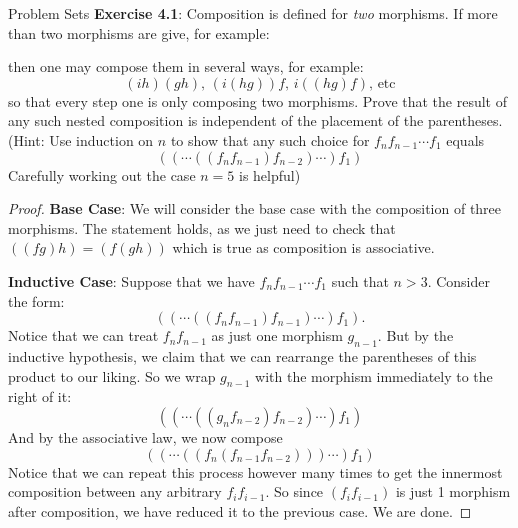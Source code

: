 \documentclass{report}
\begin{document}
\begin{exercises}{Problem Sets}
    \textbf{Exercise 4.1}: Composition is defined for \textit{two} morphisms. If more than two morphisms are give, for example:
        \begin{center}
        \end{center}
    then one may compose them in several ways, for example:
        \begin{equation*}
            (ih)(gh), \, (i(hg))f, \, i((hg)f), \, \text{etc}
        \end{equation*}
    so that every step one is only composing two morphisms. Prove that the result of any such nested composition is independent of the placement of the parentheses. (Hint: Use induction on $n$ to show that any such choice for $f_{n}f_{n - 1}\cdots f_{1}$ equals
        \begin{equation*}
            ((\cdots((f_{n}f_{n - 1})f_{n - 2})\cdots)f_{1})
        \end{equation*}
    Carefully working out the case $n = 5$ is helpful)
        \begin{proof}
            \textbf{Base Case}: We will consider the base case with the composition of three morphisms. The statement holds, as we just need to check that $((fg)h) = (f(gh))$ which is true as composition is associative.

            \textbf{Inductive Case}: Suppose that we have $f_{n}f_{n - 1}\cdots f_{1}$ such that $n > 3$. Consider the form:
                \begin{equation*}
                    ((\cdots((f_{n}f_{n - 1})f_{n - 1})\cdots)f_{1}).
                \end{equation*}
            Notice that we can treat $f_{n}f_{n - 1}$ as just one morphism $g_{n - 1}$. But by the inductive hypothesis, we claim that we can rearrange the parentheses of this product to our liking. So we wrap $g_{n - 1}$ with the morphism immediately to the right of it:
                \begin{equation*}
                    ((\cdots((g_{n}f_{n - 2})f_{n - 2})\cdots)f_{1})
                \end{equation*}
            And by the associative law, we now compose
                \begin{equation*}
                    ((\cdots((f_{n}(f_{n - 1}f_{n - 2})))\cdots)f_{1})
                \end{equation*}
            Notice that we can repeat this process however many times to get the innermost composition between any arbitrary $f_{i}f_{i - 1}$. So since $(f_{i}f_{i - 1})$ is just 1 morphism after composition, we have reduced it to the previous case. We are done.
        \end{proof}


\end{exercises}
\end{document}
